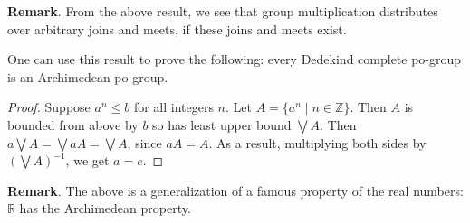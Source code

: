 \documentclass[12pt]{article}
\begin{document}
\textbf{Remark}.  From the above result, we see that group multiplication distributes over arbitrary joins and meets, if these joins and meets exist.

One can use this result to prove the following: every Dedekind complete po-group is an Archimedean po-group.
\begin{proof}
Suppose $a^n\le b$ for all integers $n$.  Let $A=\lbrace a^n\mid n\in \mathbb{Z}\rbrace$.  Then $A$ is bounded from above by $b$ so has least upper bound $\bigvee A$.  Then $a\bigvee A=\bigvee aA=\bigvee A$, since $aA=A$.  As a result, multiplying both sides by $(\bigvee A)^{-1}$, we get $a=e$.
\end{proof}

\textbf{Remark}.  The above is a generalization of a famous property of the real numbers: $\mathbb{R}$ has the Archimedean property.
\end{document}
